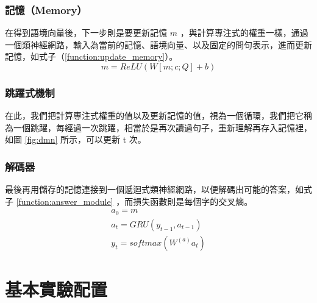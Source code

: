\subsubsection{記憶（Memory）}
在得到語境向量後，下一步則是要更新記憶 $m$ ，與計算專注式的權重一樣，通過一個類神經網路，輸入為當前的記憶、語境向量、以及固定的問句表示，進而更新記憶，如式子（\ref{function:update_memory}）。
\begin{equation}
    m = ReLU(W [m; c; Q] +b) \label{function:update_memory}
\end{equation}
\subsubsection{跳躍式機制}
在此，我們把計算專注式權重的值以及更新記憶的值，視為一個循環，我們把它稱為一個跳躍，每經過一次跳躍，相當於是再次讀過句子，重新理解再存入記憶裡，如圖 \ref{fig:dmn} 所示，可以更新 t 次。
\subsubsection{解碼器}
最後再用儲存的記憶連接到一個遞迴式類神經網路，以便解碼出可能的答案，如式子 \ref{function:answer_module} ，而損失函數則是每個字的交叉熵。
\begin{equation}
    \label{function:answer_module}
    \begin{aligned}
    a_0 = m \\
    a_t = GRU(y_{t-1}, a_{t-1}) \\
    y_t = softmax(W^{(a)} a_t)
    \end{aligned}
\end{equation}

\section{基本實驗配置}
